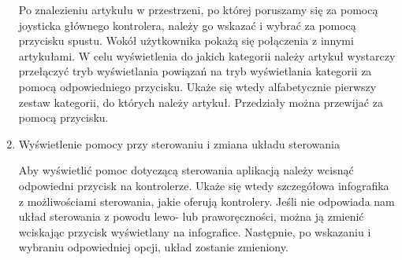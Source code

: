 \begin{enumerate}
	Po znalezieniu artykułu w przestrzeni, po której poruszamy się za pomocą joysticka głównego kontrolera, należy go wskazać i wybrać za pomocą przycisku spustu. Wokół użytkownika pokażą się połączenia z innymi artykułami. W celu wyświetlenia do jakich kategorii należy artykuł wystarczy przełączyć tryb wyświetlania powiązań na tryb wyświetlania kategorii  za pomocą odpowiedniego przycisku. Ukaże się wtedy alfabetycznie pierwszy zestaw kategorii, do których należy artykuł. Przedziały można przewijać za pomocą przycisku.
	
\item Wyświetlenie pomocy przy sterowaniu i zmiana układu sterowania

	Aby wyświetlić pomoc dotyczącą sterowania aplikacją należy wcisnąć odpowiedni przycisk na kontrolerze. Ukaże się wtedy szczegółowa infografika z możliwościami sterowania, jakie oferują kontrolery. Jeśli nie odpowiada nam układ sterowania z powodu lewo- lub praworęczności, można ją zmienić wciskając przycisk wyświetlany na infografice. Następnie, po wskazaniu i wybraniu odpowiedniej opcji, układ zostanie zmieniony.
\end{enumerate}
